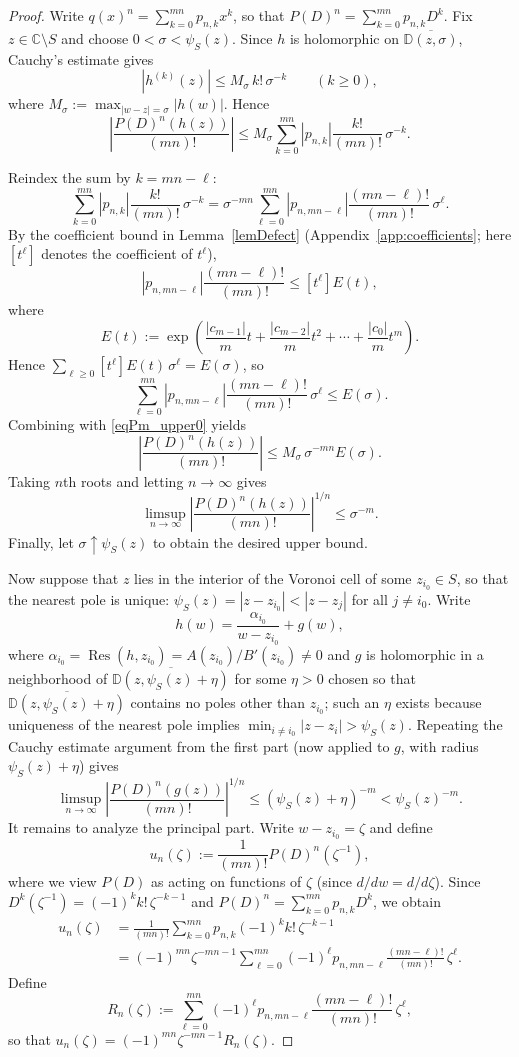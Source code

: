\documentclass[12pt]{article}
\theoremstyle{plain}
\theoremstyle{definition}
\begin{document}
\begin{proof}
Write $q(x)^n=\sum_{k=0}^{mn}p_{n,k}x^k$, so that $P(D)^n=\sum_{k=0}^{mn}p_{n,k}D^k$.
Fix $z\in\mathbb C\setminus S$ and choose $0<\sigma<\psi_S(z)$.
Since $h$ is holomorphic on $\overline{\mathbb{D}(z,\sigma)}$, Cauchy's estimate gives
$$|h^{(k)}(z)|\le M_\sigma\,k!\,\sigma^{-k}\qquad (k\ge0),$$
where $M_\sigma:=\max_{|w-z|=\sigma}|h(w)|$.
Hence
\begin{equation}\label{eqPm_upper0}
\left|\frac{P(D)^n(h(z))}{(mn)!}\right|
\le M_\sigma\sum_{k=0}^{mn}|p_{n,k}|\frac{k!}{(mn)!}\,\sigma^{-k}.
\end{equation}

Reindex the sum by $k=mn-\ell$:
$$\sum_{k=0}^{mn}|p_{n,k}|\frac{k!}{(mn)!}\,\sigma^{-k}
=\sigma^{-mn}\sum_{\ell=0}^{mn}|p_{n,mn-\ell}|\frac{(mn-\ell)!}{(mn)!}\,\sigma^{\ell}.$$
By the coefficient bound in Lemma~\ref{lemDefect} (Appendix~\ref{app:coefficients}; here $[t^\ell]$ denotes the coefficient of $t^\ell$),
$$|p_{n,mn-\ell}|\frac{(mn-\ell)!}{(mn)!}\le [t^\ell]E(t),$$
where
$$E(t):=\exp\!\left(\frac{|c_{m-1}|}{m}t+\frac{|c_{m-2}|}{m}t^2+\cdots+\frac{|c_0|}{m}t^m\right).$$
Hence $\sum_{\ell\ge0}[t^\ell]E(t)\,\sigma^\ell=E(\sigma)$, so
$$\sum_{\ell=0}^{mn}|p_{n,mn-\ell}|\frac{(mn-\ell)!}{(mn)!}\,\sigma^{\ell}\le E(\sigma).$$
Combining with \eqref{eqPm_upper0} yields
$$\left|\frac{P(D)^n(h(z))}{(mn)!}\right|
\le M_\sigma\,\sigma^{-mn}E(\sigma).$$
Taking $n$th roots and letting $n\to\infty$ gives
$$\limsup_{n\to\infty}\left|\frac{P(D)^n(h(z))}{(mn)!}\right|^{1/n}\le \sigma^{-m}.$$
Finally, let $\sigma\uparrow\psi_S(z)$ to obtain the desired upper bound.

Now suppose that $z$ lies in the interior of the Voronoi cell of some $z_{i_0}\in S$, so that the nearest pole is unique: $\psi_S(z)=|z-z_{i_0}|<|z-z_j|$ for all $j\neq i_0$.
Write
$$h(w)=\frac{\alpha_{i_0}}{w-z_{i_0}}+g(w),$$
where $\alpha_{i_0}=\operatorname{Res}(h,z_{i_0})=A(z_{i_0})/B'(z_{i_0})\neq0$ and $g$ is holomorphic in a neighborhood of $\overline{\mathbb{D}(z,\psi_S(z)+\eta)}$ for some $\eta>0$ chosen so that $\overline{\mathbb{D}(z,\psi_S(z)+\eta)}$ contains no poles other than $z_{i_0}$; such an $\eta$ exists because uniqueness of the nearest pole implies $\min_{i\ne i_0}|z-z_i|>\psi_S(z)$.
Repeating the Cauchy estimate argument from the first part (now applied to $g$, with radius $\psi_S(z)+\eta$) gives
$$\limsup_{n\to\infty}\left|\frac{P(D)^n(g(z))}{(mn)!}\right|^{1/n}\le (\psi_S(z)+\eta)^{-m}<\psi_S(z)^{-m}.$$
It remains to analyze the principal part. Write $w-z_{i_0}=\zeta$ and define
$$u_n(\zeta):=\frac{1}{(mn)!}P(D)^n(\zeta^{-1}),$$
where we view $P(D)$ as acting on functions of $\zeta$ (since $d/dw=d/d\zeta$).
Since $D^k(\zeta^{-1})=(-1)^k k!\,\zeta^{-k-1}$ and $P(D)^n=\sum_{k=0}^{mn}p_{n,k}D^k$, we obtain
\begin{align*}
u_n(\zeta)
&=\frac{1}{(mn)!}\sum_{k=0}^{mn}p_{n,k}(-1)^k k!\,\zeta^{-k-1}\\
&=(-1)^{mn}\zeta^{-mn-1}\sum_{\ell=0}^{mn}(-1)^{\ell}p_{n,mn-\ell}\frac{(mn-\ell)!}{(mn)!}\,\zeta^{\ell}.
\end{align*}
Define
$$R_n(\zeta):=\sum_{\ell=0}^{mn}(-1)^{\ell}p_{n,mn-\ell}\frac{(mn-\ell)!}{(mn)!}\,\zeta^{\ell},$$
so that $u_n(\zeta)=(-1)^{mn}\zeta^{-mn-1}R_n(\zeta)$.


\end{proof}
\end{document}
